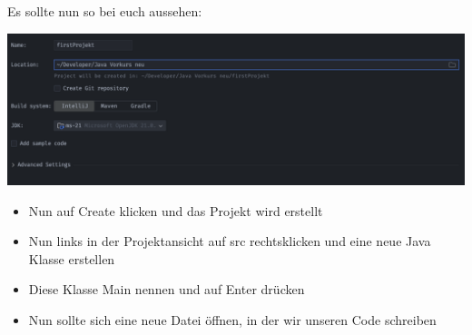 \documentclass{../sheet}
\begin{document}
Es sollte nun so bei euch aussehen:

  \includegraphics[width=1\linewidth]{img/projektCreation.png}

  \begin{itemize}
    \item Nun auf Create klicken und das Projekt wird erstellt
    \item Nun links in der Projektansicht auf src rechtsklicken und eine neue Java Klasse erstellen
    \item Diese Klasse Main nennen und auf Enter drücken
    \item Nun sollte sich eine neue Datei öffnen, in der wir unseren Code schreiben
  \end{itemize}
\end{document}

